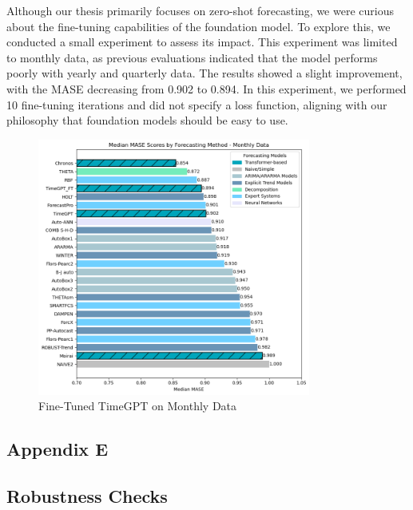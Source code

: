 \documentclass[12pt,a4paper]{article}
\begin{document}
Although our thesis primarily focuses on zero-shot forecasting, we were curious about the fine-tuning capabilities of the foundation model. To explore this, we conducted a small experiment to assess its impact. This experiment was limited to monthly data, as previous evaluations indicated that the model performs poorly with yearly and quarterly data. The results showed a slight improvement, with the MASE decreasing from 0.902 to 0.894. In this experiment, we performed 10 fine-tuning iterations and did not specify a loss function, aligning with our philosophy that foundation models should be easy to use.

\begin{figure}[htbp]
  \centering
  \includegraphics[width=0.8\textwidth]{timegpt_finetune_fig.png}
  \caption{Fine-Tuned TimeGPT on Monthly Data}
  \label{timegpt_finetune_fig}
\end{figure}

\newpage

\begin{center}
  \item  \section*{Appendix E} \label{appendix_e}
\end{center}


\subsection*{Robustness Checks}
\end{document}
